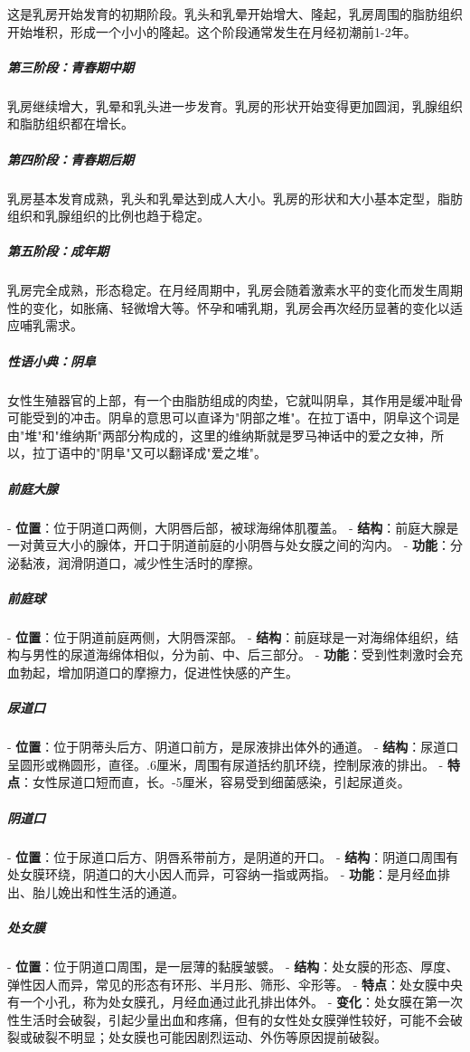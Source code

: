 \begin{enumerate}
这是乳房开始发育的初期阶段。乳头和乳晕开始增大、隆起，乳房周围的脂肪组织开始堆积，形成一个小小的隆起。这个阶段通常发生在月经初潮前1-2年。

\subparagraph{第三阶段：青春期中期}

乳房继续增大，乳晕和乳头进一步发育。乳房的形状开始变得更加圆润，乳腺组织和脂肪组织都在增长。

\subparagraph{第四阶段：青春期后期}

乳房基本发育成熟，乳头和乳晕达到成人大小。乳房的形状和大小基本定型，脂肪组织和乳腺组织的比例也趋于稳定。

\subparagraph{第五阶段：成年期}

乳房完全成熟，形态稳定。在月经周期中，乳房会随着激素水平的变化而发生周期性的变化，如胀痛、轻微增大等。怀孕和哺乳期，乳房会再次经历显著的变化以适应哺乳需求。

\subparagraph{性语小典：阴阜}

女性生殖器官的上部，有一个由脂肪组成的肉垫，它就叫阴阜，其作用是缓冲耻骨可能受到的冲击。阴阜的意思可以直译为"阴部之堆"。在拉丁语中，阴阜这个词是由"堆"和"维纳斯"两部分构成的，这里的维纳斯就是罗马神话中的爱之女神，所以，拉丁语中的"阴阜"又可以翻译成"爱之堆"。

\subparagraph{前庭大腺}
- \textbf{位置}：位于阴道口两侧，大阴唇后部，被球海绵体肌覆盖。
- \textbf{结构}：前庭大腺是一对黄豆大小的腺体，开口于阴道前庭的小阴唇与处女膜之间的沟内。
- \textbf{功能}：分泌黏液，润滑阴道口，减少性生活时的摩擦。

\subparagraph{前庭球}
- \textbf{位置}：位于阴道前庭两侧，大阴唇深部。
- \textbf{结构}：前庭球是一对海绵体组织，结构与男性的尿道海绵体相似，分为前、中、后三部分。
- \textbf{功能}：受到性刺激时会充血勃起，增加阴道口的摩擦力，促进性快感的产生。

\subparagraph{尿道口}
- \textbf{位置}：位于阴蒂头后方、阴道口前方，是尿液排出体外的通道。
- \textbf{结构}：尿道口呈圆形或椭圆形，直径。.6厘米，周围有尿道括约肌环绕，控制尿液的排出。
- \textbf{特点}：女性尿道口短而直，长。-5厘米，容易受到细菌感染，引起尿道炎。

\subparagraph{阴道口}
- \textbf{位置}：位于尿道口后方、阴唇系带前方，是阴道的开口。
- \textbf{结构}：阴道口周围有处女膜环绕，阴道口的大小因人而异，可容纳一指或两指。
- \textbf{功能}：是月经血排出、胎儿娩出和性生活的通道。

\subparagraph{处女膜}
- \textbf{位置}：位于阴道口周围，是一层薄的黏膜皱襞。
- \textbf{结构}：处女膜的形态、厚度、弹性因人而异，常见的形态有环形、半月形、筛形、伞形等。
- \textbf{特点}：处女膜中央有一个小孔，称为处女膜孔，月经血通过此孔排出体外。
- \textbf{变化}：处女膜在第一次性生活时会破裂，引起少量出血和疼痛，但有的女性处女膜弹性较好，可能不会破裂或破裂不明显；处女膜也可能因剧烈运动、外伤等原因提前破裂。


\end{enumerate}

